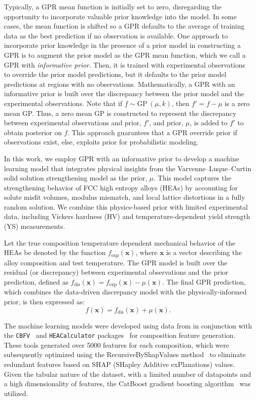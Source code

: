 Typically, a GPR mean function is initially set to zero, disregarding the opportunity to incorporate valuable prior knowledge into the model. In some cases, the mean function is shifted so a GPR defaults to the average of training data as the best prediction if no observation is available. One approach to incorporate prior knowledge in the presence of a prior model in constructing a GPR is to augment the prior model as the GPR mean function, which we call a GPR with \textit{informative prior}. Then, it is trained with experimental observations to override the prior model predictions, but it defaults to the prior model predictions at regions with no observations. Mathematically, a GPR with an informative prior is built over the discrepancy between the prior model and the experimental observations. Note that if $f\sim \textrm{GP}~(\mu,k)$, then $f'=f-\mu$ is a zero mean GP. Thus, a zero mean GP is constructed to represent the discrepancy between experimental observations and prior, $f'$, and prior, $\mu$, is added to $f'$ to obtain posterior on $f$. This approach guarantees that a GPR override prior if observations exist, else, exploits prior for probabilistic modeling.

In this work, we employ GPR with an informative prior to develop a machine learning model that integrates physical insights from the Varvenne–Luque–Curtin solid solution strengthening model \cite{varvenne2016theory} as the prior, \(\mu\). This model captures the strengthening behavior of FCC high entropy alloys (HEAs) by accounting for solute misfit volumes, modulus mismatch, and local lattice distortions in a fully random solution. We combine this physics-based prior with limited experimental data, including Vickers hardness (HV) and temperature-dependent yield strength (YS) measurements.

Let the true composition temperature dependent mechanical behavior of the HEAs be denoted by the function \(f_{\textrm{exp}}(\mathbf{x})\), where \(\mathbf{x}\) is a vector describing the alloy composition and test temperature. The GPR model is built over the residual (or discrepancy) between experimental observations and the prior prediction, defined as \(f_{\textrm{dis}}(\mathbf{x}) = f_{\textrm{exp}}(\mathbf{x}) - \mu(\mathbf{x})\). The final GPR prediction, which combines the data-driven discrepancy model with the physically-informed prior, is then expressed as:
\[
f(\mathbf{x}) = f_{\textrm{dis}}(\mathbf{x}) + \mu(\mathbf{x}).
\]


The machine learning models were developed using data from \cite{hastings2025acceleratedmultiobjectivealloydiscovery} in conjunction with the {\tt CBFV}~\cite{Murdock2020IsProperties} and {\tt HEACalculator} packages~\cite{doguhan_sariturk_2022_7429046} for composition feature generation. These tools generated over 5000 features for each composition, which were subsequently optimized using the RecursiveByShapValues method~\cite{Prokhorenkova2018CatBoost:Features} to eliminate redundant features based on SHAP (SHapley Additive exPlanations) values. Given the tabular nature of the dataset, with a limited number of datapoints and a high dimensionality of features, the CatBoost gradient boosting algorithm~\cite{Prokhorenkova2018CatBoost:Features} was utilized.


